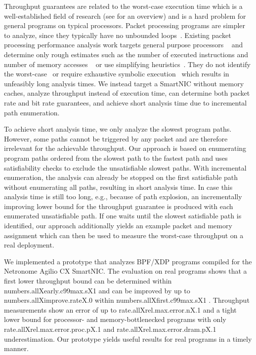 \documentclass[sigconf,screen,authordraft]{acmart}
\newcommand{\eg}{e.g.,}
\newcommand{\mdata}[3]{%
	\csname #1X#2X#3\endcsname%
}
\begin{document}
Throughput guarantees are related to the worst-case execution time which is a well-established field of research (see \cite{wcet} for an overview) and is a hard problem for general programs on typical processors.
Packet processing programs are simpler to analyze, since they typically have no unbounded loops~\cite{BOLT,gauntlet,lemur}.
Existing packet processing performance analysis work targets general purpose processors ~\cite{symperf,castan,BOLT} and determine only rough estimates such as the number of executed instructions and number of memory accesses ~\cite{BOLT} or use simplifying heuristics~\cite{symperf,castan}.
They do not identify the worst-case~\cite{castan} or require exhaustive symbolic execution~\cite{symperf,BOLT} which results in unfeasibly long analysis times.
We instead target a SmartNIC without memory caches, analyze throughput instead of execution time, can determine both packet rate and bit rate guarantees, and achieve short analysis time due to incremental path enumeration.

To achieve short analysis time, we only analyze the slowest program paths.
However, some paths cannot be triggered by any packet and are therefore irrelevant for the achievable throughput.
Our approach is based on enumerating program paths ordered from the slowest path to the fastest path and uses satisfiability checks to exclude the unsatisfiable slowest paths.
With incremental enumeration, the analysis can already be stopped on the first satisfiable path without enumerating all paths, resulting in short analysis time.
In case this analysis time is still too long, \eg{} because of path explosion, an incrementally improving lower bound for the throughput guarantee is produced with each enumerated unsatisfiable path.
If one waits until the slowest satisfiable path is identified, our approach additionally yields an example packet and memory assignment which can then be used to measure the worst-case throughput on a real deployment.

We implemented a prototype that analyzes BPF/XDP programs compiled for the Netronome Agilio CX SmartNIC.
The evaluation on real programs shows that a first lower throughput bound can be determined within \mdata{numbers.all}{early.c99max.s}{1} and can be improved by up to \mdata{numbers.all}{improve.rate}{.0} within \mdata{numbers.all}{first.c99max.s}{1}.
Throughput measurements show an error of up to \mdata{rate.all}{rel.max.error.n}{.1} and a tight lower bound for processor- and memory-bottlenecked programs with only \mdata{rate.all}{rel.max.error.proc.p}{.1} and \mdata{rate.all}{rel.max.error.dram.p}{.1} underestimation.
Our prototype yields useful results for real programs in a timely manner.
\end{document}
